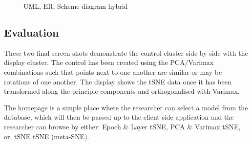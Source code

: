\documentclass[a4paper,11pt,titlepage]{article}
\begin{document}
				
	\begin{figure}[H]
    			\caption{UML, ER, Scheme diagram hybrid}%
	\end{figure}	

	
\subsection{Evaluation}
These two final screen shots demonstrate the control cluster side by side with the display cluster. The control has been created using the PCA/Varimax combinations such that points next to one another are similar or may be rotations of one another. The display shows the tSNE data once it has been transformed along the principle components and orthogonalised with Varimax. 
\par 
The homepage is a simple place where the researcher can select a model from the database, which will then be passed up to the client side application and the researcher can browse by either: Epoch \& Layer tSNE, PCA \& Varimax tSNE, or, tSNE tSNE (meta-SNE).
\end{document}
